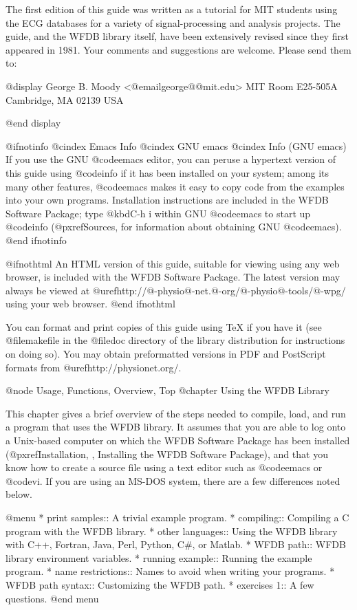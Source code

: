 The first edition of this guide was written as a tutorial for MIT
students using the ECG databases for a variety of signal-processing and
analysis projects.  The guide, and the WFDB library itself, have been
extensively revised since they first appeared in 1981.  Your comments
and suggestions are welcome.  Please send them to:

@display
George B. Moody  <@email{george@@mit.edu}>
MIT Room E25-505A
Cambridge, MA 02139
USA

@end display

@ifnotinfo
@cindex Emacs Info
@cindex GNU emacs
@cindex Info (GNU emacs)
If you use the GNU @code{emacs} editor, you can peruse a hypertext
version of this guide using @code{info} if it has been installed on your
system; among its many other features, @code{emacs} makes it easy to
copy code from the examples into your own programs.  Installation
instructions are included in the WFDB Software Package; type @kbd{C-h i}
within GNU @code{emacs} to start up @code{info} (@pxref{Sources}, for
information about obtaining GNU @code{emacs}).
@end ifnotinfo

@ifnothtml
An HTML version of this guide, suitable for viewing using any web browser,
is included with the WFDB Software Package.  The latest version may always be
viewed at @uref{http://@-physio@-net.@-org/@-physio@-tools/@-wpg/} using your web
browser.
@end ifnothtml

You can format and print copies of this guide using TeX if you have it (see
@file{makefile} in the @file{doc} directory of the library distribution for
instructions on doing so).  You may obtain preformatted versions in PDF and
PostScript formats from @uref{http://physionet.org/}.


@node     Usage, Functions, Overview, Top
@chapter Using the WFDB Library

This chapter gives a brief overview of the steps needed to compile,
load, and run a program that uses the WFDB library.  It assumes that you
are able to log onto a Unix-based computer on which the WFDB Software
Package has been installed
(@pxref{Installation, , Installing the WFDB Software Package}),
and that you know how to create a source file using a text editor such
as @code{emacs} or @code{vi}.  If you are using an MS-DOS system, there
are a few differences noted below.


@menu
* print samples::		A trivial example program.
* compiling::			Compiling a C program with the WFDB library.
* other languages::             Using the WFDB library with C++, Fortran,
                                  Java, Perl, Python, C#, or Matlab.
* WFDB path::			WFDB library environment variables.
* running example::		Running the example program.
* name restrictions::		Names to avoid when writing your programs.
* WFDB path syntax::		Customizing the WFDB path.
* exercises 1::			A few questions.
@end menu

